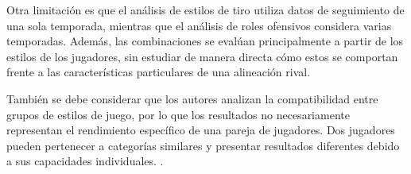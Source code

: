 Otra limitación es que el análisis de estilos de tiro utiliza datos de seguimiento de una sola temporada, mientras que el análisis de roles ofensivos considera varias temporadas. Además, las combinaciones se evalúan principalmente a partir de los estilos de los jugadores, sin estudiar de manera directa cómo estos se comportan frente a las características particulares de una alineación rival.

También se debe considerar que los autores analizan la compatibilidad entre grupos de estilos de juego, por lo que los resultados no necesariamente representan el rendimiento específico de una pareja de jugadores. Dos jugadores pueden pertenecer a categorías similares y presentar resultados diferentes debido a sus capacidades individuales.
 \cite{yamada2024offensivelineupanalysisbasketball}.
